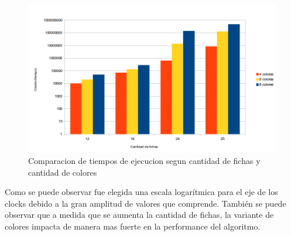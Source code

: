 \begin{figure}[h]
\begin{center}
\includegraphics[scale=0.7]{./img/ej3_performance.png}
\caption{Comparacion de tiempos de ejecucion segun cantidad de fichas y cantidad de colores}
\end{center}
\end{figure}

Como se puede observar fue elegida una escala logar\'itmica para el eje de los clocks debido a la gran amplitud de valores que comprende. Tambi\'en se puede observar que a medida que se aumenta la cantidad de fichas, la variante de colores impacta de manera mas fuerte en la performance del algoritmo.
